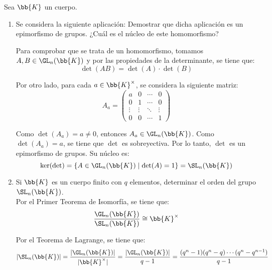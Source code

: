 \begin{ejercicio}
    Sea $\bb{K}$ un cuerpo.
    \begin{enumerate}
        \item Se considera la siguiente aplicación:
        Demostrar que dicha aplicación es un epimorfismo de grupos. ¿Cuál es el núcleo de este homomorfismo?

        Para comprobar que se trata de un homomorfismo, tomamos $A,B\in \GL_n(\bb{K})$ y por las propiedades de la determinante, se tiene que:
        \begin{equation*}
            \det(AB) = \det(A)\cdot\det(B)
        \end{equation*}

        Por otro lado, para cada $a\in \bb{K}^\times$, se considera la siguiente matriz:
        \begin{equation*}
            A_a = \begin{pmatrix}
                a & 0 & \cdots & 0 \\
                0 & 1 & \cdots & 0 \\
                \vdots & \vdots & \ddots & \vdots \\
                0 & 0 & \cdots & 1
            \end{pmatrix}
        \end{equation*}

        Como $\det(A_a)=a\neq 0$, entonces $A_a\in \GL_n(\bb{K})$. Como $\det(A_a)=a$, se tiene que $\det$ es sobreyectiva. Por lo tanto, $\det$ es un epimorfismo de grupos. Su núcleo es:
        \begin{equation*}
            \ker(\det) = \{A\in \GL_n(\bb{K})\mid \det(A)=1\} = \SL_n(\bb{K})
        \end{equation*}
        \item Si $\bb{K}$ es un cuerpo finito con $q$ elementos, determinar el orden del grupo $\SL_n(\bb{K})$.\\
        
        Por el Primer Teorema de Isomorfía, se tiene que:
        \begin{equation*}
            \dfrac{\GL_n(\bb{K})}{\SL_n(\bb{K})}\cong \bb{K}^\times
        \end{equation*}

        Por el Teorema de Lagrange, se tiene que:
        \begin{equation*}
            |\SL_n(\bb{K})| = \dfrac{|\GL_n(\bb{K})|}{|\bb{K}^\times|} = \dfrac{|\GL_n(\bb{K})|}{q-1} = \dfrac{(q^n-1)(q^n-q)\cdots(q^n-q^{n-1})}{q-1}
        \end{equation*}
    \end{enumerate}
\end{ejercicio}

